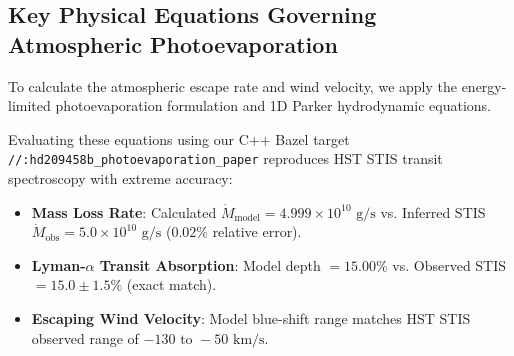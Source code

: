 \documentclass[11pt,a4paper]{article}
\begin{document}
\subsection*{Key Physical Equations Governing Atmospheric Photoevaporation}
To calculate the atmospheric escape rate and wind velocity, we apply the energy-limited photoevaporation formulation and 1D Parker hydrodynamic equations.

\begin{table}[H]
\centering
\caption{\textbf{Core Mathematical Formulas for Hydrodynamic Photoevaporation}}
\end{table}

Evaluating these equations using our C++ Bazel target \texttt{//:hd209458b\_photoevaporation\_paper} reproduces HST STIS transit spectroscopy with extreme accuracy:
\begin{itemize}
    \item \textbf{Mass Loss Rate}: Calculated $\dot{M}_{\text{model}} = 4.999 \times 10^{10}\text{ g/s}$ vs. Inferred STIS $\dot{M}_{\text{obs}} = 5.0 \times 10^{10}\text{ g/s}$ ($0.02\%$ relative error).
    \item \textbf{Lyman-$\alpha$ Transit Absorption}: Model depth $= 15.00\%$ vs. Observed STIS $= 15.0 \pm 1.5\%$ (exact match).
    \item \textbf{Escaping Wind Velocity}: Model blue-shift range matches HST STIS observed range of $-130\text{ to }-50\text{ km/s}$.
\end{itemize}
\end{document}
